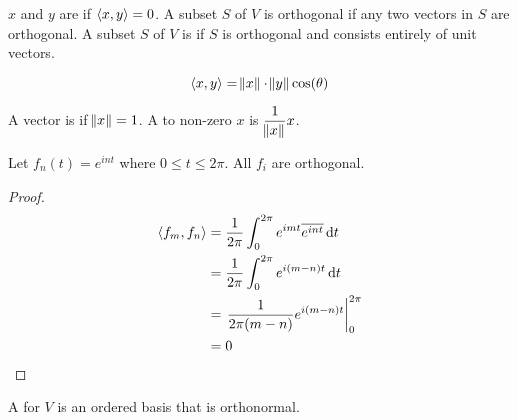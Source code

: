 \begin{definition}
	$x$ and $y$ are  if $\left\langle \displaystyle x, y \right\rangle = 0$. A subset $S$ of $V$ is orthogonal if any two vectors in $S$ are orthogonal. A subset $S$ of $V$ is  if $S$ is orthogonal and consists entirely of unit vectors.
\end{definition}

\begin{definition}
    \begin{equation}
        \left\langle \displaystyle x, y \right\rangle = \norm{x} \cdot \norm{y} \text{cos}(\theta)
    \end{equation}    
\end{definition}


\begin{definition}
	A vector is  if $\norm{x} = 1$. A  to non-zero $x$ is $\dfrac{1}{\norm{x}} x$.
\end{definition}


\begin{theorem}
    Let $f_n (t) = e^{i nt}$ where $0 \leq t \leq 2 \pi$. All $f_i$ are orthogonal.
\end{theorem}
\begin{proof}
    \begin{equation}
        \begin{aligned}
            \innerproduct{f_m}{f_n} &= \frac{1}{2 \pi} \int_0^{2 \pi} e^{imt} \overline{e^{int}} \dif{t} \\
            &= \frac{1}{2\pi} \int_0^{2\pi} e^{i (m-n) t} \dif{t} \\
            &= \left. \frac{1}{2\pi (m-n)} e^{i(m-n)t} \right|_0^{2\pi} \\
            &= 0
        \end{aligned}
    \end{equation}
\end{proof}



\begin{definition}
	A  for $V$ is an ordered basis that is orthonormal.
\end{definition}

